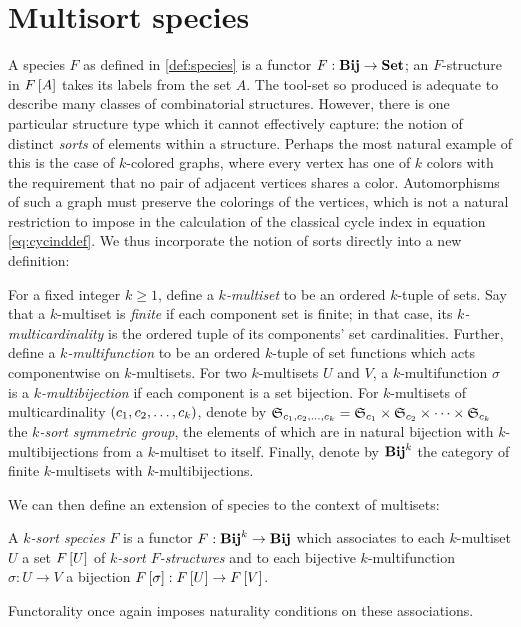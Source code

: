 \documentclass[sectionflow,singlespace,twoside,boldmathhdr,draft]{brandiss} %
\numberwithin{section}{chapter}
\numberwithin{figure}{chapter}
\begin{document}
\section{Multisort species}\label{s:mult}
A species $F$ as defined in \ref{def:species} is a functor $F: \mathbf{Bij} \to \mathbf{Set}$; an $F$-structure in $F \left[ {A} \right]$ takes its labels from the set $A$.
The tool-set so produced is adequate to describe many classes of combinatorial structures.
However, there is one particular structure type which it cannot effectively capture: the notion of distinct \emph{sorts} of elements within a structure.
Perhaps the most natural example of this is the case of $k$-colored graphs, where every vertex has one of $k$ colors with the requirement that no pair of adjacent vertices shares a color.
Automorphisms of such a graph must preserve the colorings of the vertices, which is not a natural restriction to impose in the calculation of the classical cycle index in equation \eqref{eq:cycinddef}.
We thus incorporate the notion of sorts directly into a new definition:
\begin{definition} 
  \label{def:multiset}
  For a fixed integer $k \geq 1$, define a \emph{$k$-multiset} to be an ordered $k$-tuple of sets.
  Say that a $k$-multiset is \emph{finite} if each component set is finite; in that case, its \emph{$k$-multicardinality} is the ordered tuple of its components' set cardinalities.
  Further, define a \emph{$k$-multifunction} to be an ordered $k$-tuple of set functions which acts componentwise on $k$-multisets.
  For two $k$-multisets $U$ and $V$, a $k$-multifunction $\sigma$ is a \emph{$k$-multibijection} if each component is a set bijection.
  For $k$-multisets of multicardinality $\left( {c_{1}, c_{2}, \dots, c_{k}} \right)$, denote by $ \mathfrak{S}_{c_{1}, c_{2}, \dots, c_{k}}  =  \mathfrak{S}_{c_{1}}  \times  \mathfrak{S}_{c_{2}}  \times \dots \times  \mathfrak{S}_{c_{k}} $ the \emph{$k$-sort symmetric group}, the elements of which are in natural bijection with $k$-multibijections from a $k$-multiset to itself.
  Finally, denote by $\mathbf{Bij}^{k}$ the category of finite $k$-multisets with $k$-multibijections.
\end{definition}

We can then define an extension of species to the context of multisets:
\begin{definition}
  \label{def:multisort}
  A \emph{$k$-sort species} $F$ is a functor $F: \mathbf{Bij}^{k} \to \mathbf{Bij}$ which associates to each $k$-multiset $U$ a set $F \left[ {U} \right]$ of \emph{$k$-sort $F$-structures} and to each bijective $k$-multifunction $\sigma: U \to V$ a bijection $F \left[ {\sigma} \right]: F \left[ {U} \right] \to F \left[ {V} \right]$.
\end{definition}
Functorality once again imposes naturality conditions on these associations.
\end{document}
